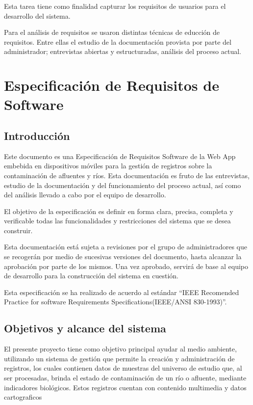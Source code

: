   Esta tarea tiene como finalidad capturar los requisitos de usuarios para el desarrollo del sistema.
  
  Para el análisis de requisitos se usaron distintas técnicas de educción de requisitos. Entre ellas el estudio de la documentación provista por parte del administrador; entrevistas abiertas y estructuradas, análisis del proceso actual.

\section{Especificación de Requisitos de Software}

\renewcommand{\thesubsection}{\arabic{subsection}}
 \subsection{Introducción}
 
 Este documento es una Especificación de Requisitos Software de la  Web App embebida en dispositivos móviles para la gestión de registros sobre la contaminación de afluentes y ríos. Esta documentación es fruto de las entrevistas, estudio de la documentación y del funcionamiento del proceso actual, así como del análisis llevado a cabo por el equipo de desarrollo.

El objetivo de la especificación es definir en forma clara, precisa, completa y verificable todas las funcionalidades y restricciones del sistema que se desea construir.

Esta documentación está sujeta a revisiones por el grupo de administradores que se recogerán por medio de sucesivas versiones del documento, hasta alcanzar la aprobación por parte de los mismos. Una vez aprobado, servirá de base al equipo de desarrollo para la construcción del sistema en cuestión.

Esta especificación se ha realizado de acuerdo al estándar “IEEE Recomended Practice for software Requirements Specifications(IEEE/ANSI 830-1993)”.


    \subsection{Objetivos y alcance del sistema}

    El presente proyecto tiene como objetivo principal ayudar al medio ambiente, utilizando un sistema de gestión que permite la creación y administración de registros, los cuales contienen datos de muestras del universo de estudio que, al ser procesadas, brinda el estado de contaminación de un río o afluente, mediante indicadores biológicos.
    Estos registros cuentan con contenido multimedia y datos cartograficos


